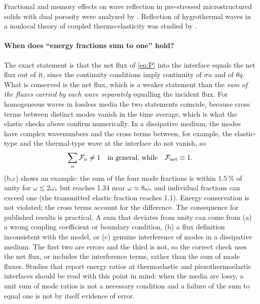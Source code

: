 Fractional and memory effects on wave reflection in pre-stressed microstructured solids with dual porosity were analyzed by \citep{Das2025}. Reflection of hygrothermal waves in a nonlocal theory of coupled thermo-elasticity was studied by \citep{Yadav2022}.

\paragraph{When does ``energy fractions sum to one'' hold?} The exact statement is that the net flux of \eqref{eq:P} into the interface equals the net flux out of it, since the continuity conditions imply continuity of $\sigma\dot u$ and of $\theta q$. What is conserved is the net flux, which is a weaker statement than the \emph{sum of the fluxes carried by each wave separately} equalling the incident flux. For homogeneous waves in lossless media the two statements coincide, because cross terms between distinct modes vanish in the time average, which is what the elastic checks above confirm numerically. In a dissipative medium, the modes have complex wavenumbers and the cross terms between, for example, the elastic-type and the thermal-type wave at the interface do not vanish, so
\begin{equation}
\sum_n\mathcal F_n\ne1\quad\text{in general, while}\quad \mathcal F_{\rm net}\equiv1.
\end{equation}
(b,c) shows an example: the sum of the four mode fractions is within $1.5\,\%$ of unity for $\omega\lesssim2\omega_*$ but reaches 1.34 near $\omega\approx8\omega_*$ and individual fractions can exceed one (the transmitted elastic fraction reaches 1.1). Energy conservation is not violated; the cross terms account for the difference. The consequence for published results is practical. A sum that deviates from unity can come from (a) a wrong coupling coefficient or boundary condition, (b) a flux definition inconsistent with the model, or (c) genuine interference of modes in a dissipative medium. The first two are errors and the third is not, so the correct check uses the net flux, or includes the interference terms, rather than the sum of mode fluxes. Studies that report energy ratios at thermoelastic and piezothermoelastic interfaces \citep{Barak2023,Barak2023IJP,Barak2023JTS,Barak2023MMMS,Gupta2023Energy,Kumar2023PhysScr,Kumar2019,Kumar2022,Kumar2024,Kumar2024a} should be read with this point in mind: when the media are lossy, a unit sum of mode ratios is not a necessary condition and a failure of the sum to equal one is not by itself evidence of error.

